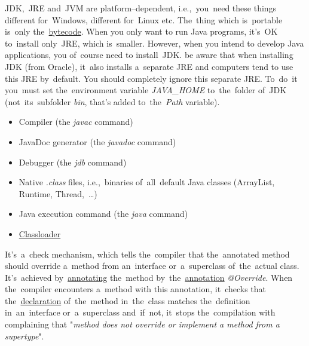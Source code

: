 \noindent JDK,~JRE and~JVM are platform--dependent, i.e.,~you~need these things different for~Windows, different for~Linux etc. The~thing which is~portable is~only the~\hyperref[bytecode]{bytecode}. When you only want to run Java programs, it's~OK to~install only~JRE, which is~smaller. However, when you intend to develop Java applications, you of~course need to install~JDK. be aware that when installing JDK (from Oracle), it~also installs a~separate JRE and computers tend to use this JRE by~default. You should completely ignore this separate JRE. To~do~it you~must set the~environment variable \textit{JAVA\_HOME} to~the~folder of~JDK (not~its~subfolder \textit{bin}, that's added to~the~\textit{Path} variable).

\begin{itemize}
    \item Compiler (the \textit{javac} command)
    \item JavaDoc generator (the \textit{javadoc} command)
    \item Debugger (the \textit{jdb} command)
\end{itemize}

\begin{itemize}
    \item Native \textit{.class} files, i.e.,~binaries of~all~default Java classes (ArrayList, Runtime, Thread,~\dots)
    \item Java execution command (the \textit{java} command)
    \item \hyperref[classloaders]{Classloader}
\end{itemize}

\label{javadatatypes}

\label{javaaccessmodifiers}

\label{javaoverride}
It's~a~check mechanism, which tells the~compiler that the~annotated method should override a~method from an~interface or~a~superclass of~the~actual class. It's~achieved by~\hyperref[javaannotation]{annotating} the~method by~the~\hyperref[javaannotation]{annotation} \textit{@Override}. When the~compiler encounters a~method with this annotation, it~checks that the~\hyperref[declarationdefinition]{declaration} of~the~method in~the~class matches the~definition in~an~interface or~a~superclass and~if~not, it~stops the~compilation with complaining that "\textit{method does not override or implement a method from a supertype}".


